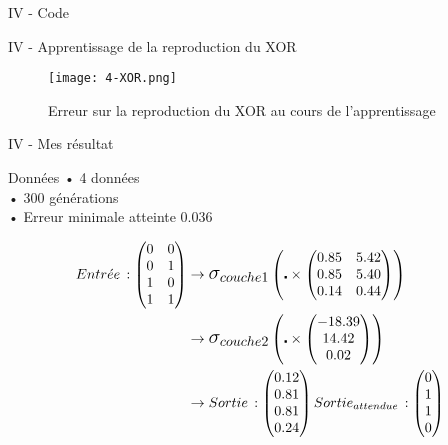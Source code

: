 \begin{frame}{IV - Code}
	
\end{frame}


\begin{frame}{IV - Apprentissage de la reproduction du XOR}
	\begin{figure}
		\centering
		\texttt{[image: 4-XOR.png]}
		\caption{Erreur sur la reproduction du XOR au cours de l'apprentissage}
	\end{figure}
\end{frame}


\begin{frame}{IV - Mes résultat}
	\begin{block}{Données}
		• 4 données \\
		• 300 générations \\
		• Erreur minimale atteinte 0.036
	\end{block}
	\begin{align*}
		Entr\acute{e} e\, :
		\begin{pmatrix}
			0 & 0 \\
			0 & 1 \\
			1 & 0 \\
			1 & 1
		\end{pmatrix}
		 & \to
		\mathlarger{\mathlarger{\sigma_{couche1}}}
		\left( \centerdot \times
		\begin{pmatrix}
				0.85 & 5.42 \\
				0.85 & 5.40 \\
				0.14 & 0.44
			\end{pmatrix}
		\right) \\
		 & \to
		\mathlarger{\mathlarger{\sigma_{couche2}}}
		\left( \centerdot \times
		\begin{pmatrix}
				-18.39 \\
				14.42  \\
				0.02
			\end{pmatrix}
		\right) \\
		 & \to
		Sortie\, :
		\begin{pmatrix}
			0.12 \\
			0.81 \\
			0.81 \\
			0.24
		\end{pmatrix}
		Sortie_{attendue}\, :
		\begin{pmatrix}
			0 \\
			1 \\
			1 \\
			0
		\end{pmatrix}
	\end{align*}
\end{frame}